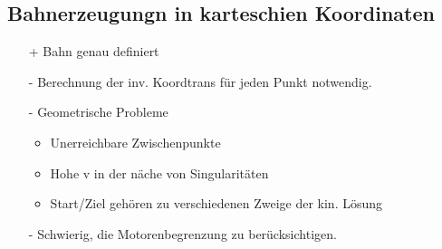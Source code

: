 \subsection{Bahnerzeugungn in karteschien Koordinaten}
\begin{multicols}{2}
    \begin{itemize}
        \item[+] Bahn genau definiert
    \end{itemize}
    
    \begin{itemize}
        \item[-] Berechnung der inv. Koordtrans für jeden Punkt notwendig.
        \item[-] Geometrische Probleme
        \begin{itemize}
            \item Unerreichbare Zwischenpunkte
            \item Hohe v in der näche von Singularitäten
            \item Start/Ziel gehören zu verschiedenen Zweige der kin. Lösung
        \end{itemize}
        \item[-] Schwierig, die Motorenbegrenzung zu berücksichtigen.
    \end{itemize}
\end{multicols}